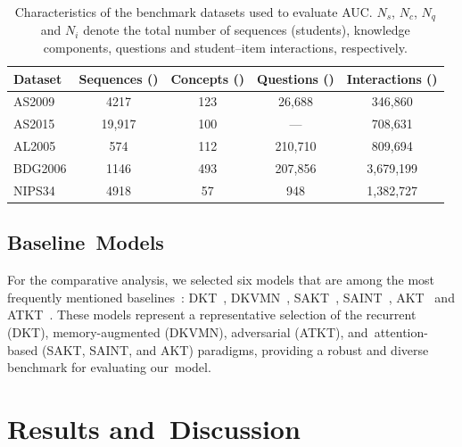\documentclass[applsci,article,accept,moreauthors,pdftex]{Definitions/mdpi}
\begin{document}
\begin{table}[H]
\centering
\caption{Characteristics of the benchmark datasets used to evaluate AUC. $N_s$, $N_c$, $N_q$ and $N_i$ denote the total number of sequences (students), knowledge components, questions and student--item interactions, respectively. \label{tab_datasets}}
\begin{tabularx}{\textwidth}{Lcccc}
\toprule
\textbf{Dataset} & \textbf{Sequences ()} & \textbf{Concepts ()} & \textbf{Questions ()} & \textbf{Interactions ()} \\
\midrule
AS2009 & 4217 & 123 & 26,688 & 346,860 \\
AS2015 & 19,917 & 100 & --- & 708,631 \\
AL2005 & 574 & 112 & 210,710 & 809,694 \\
BDG2006 & 1146 & 493 & 207,856 & 3,679,199 \\
NIPS34 & 4918 & 57 & 948 & 1,382,727 \\
\bottomrule
\end{tabularx}
\end{table}
\unskip



\subsection{Baseline~Models}\label{sec_models}

For the comparative analysis, we selected six models that are among the most frequently mentioned baselines~\citep{liu2022pykt}: DKT~\citep{piech2015deep}, DKVMN~\citep{zhang2017dynamic}, SAKT~\citep{pandey2019self}, SAINT~\citep{choi2020towards}, AKT~\citep{ghosh2020context} and ATKT~\citep{GuoHZTL21}. These models represent a representative selection of the recurrent (DKT), memory-augmented (DKVMN), adversarial (ATKT), and~attention-based (SAKT, SAINT, and AKT) paradigms, providing a robust and diverse benchmark for evaluating our~model.


\section{Results and~Discussion} \label{sec_results}
\unskip

\subsection{} \label{sec_tradeoff}
\end{document}
